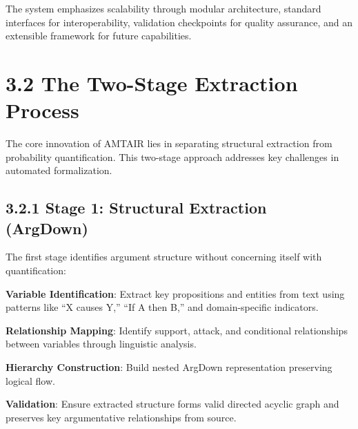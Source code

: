 \documentclass[
  11pt,
  letterpaper,
]{book}
\begin{document}
\begin{tcolorbox}[enhanced jigsaw, opacitybacktitle=0.6, colbacktitle=quarto-callout-tip-color!10!white, toptitle=1mm, colback=white, breakable, left=2mm, bottomrule=.15mm, title=\textcolor{quarto-callout-tip-color}{\faLightbulb}\hspace{0.5em}{Core Design Philosophy}, rightrule=.15mm, arc=.35mm, toprule=.15mm, opacityback=0, colframe=quarto-callout-tip-color-frame, bottomtitle=1mm, titlerule=0mm, leftrule=.75mm, coltitle=black]

The system emphasizes scalability through modular architecture, standard
interfaces for interoperability, validation checkpoints for quality
assurance, and an extensible framework for future capabilities.

\end{tcolorbox}

\section*{3.2 The Two-Stage Extraction
Process}\label{sec-two-stage-extraction}


The core innovation of AMTAIR lies in separating structural extraction
from probability quantification. This two-stage approach addresses key
challenges in automated formalization.

\subsection*{3.2.1 Stage 1: Structural Extraction
(ArgDown)}\label{sec-stage1-argdown}

The first stage identifies argument structure without concerning itself
with quantification:

\textbf{Variable Identification}: Extract key propositions and entities
from text using patterns like ``X causes Y,'' ``If A then B,'' and
domain-specific indicators.

\textbf{Relationship Mapping}: Identify support, attack, and conditional
relationships between variables through linguistic analysis.

\textbf{Hierarchy Construction}: Build nested ArgDown representation
preserving logical flow.

\textbf{Validation}: Ensure extracted structure forms valid directed
acyclic graph and preserves key argumentative relationships from source.
\end{document}
